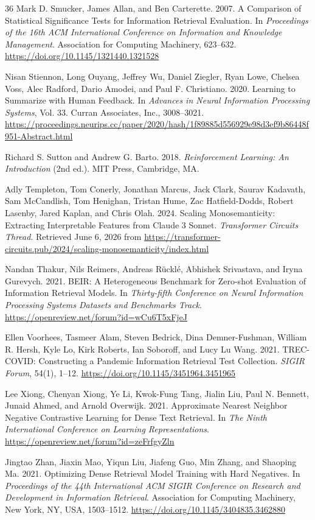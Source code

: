 \documentclass[sigconf]{acmart}
\begin{document}
\begin{thebibliography}{36}
Mark D. Smucker, James Allan, and Ben Carterette. 2007. A Comparison of Statistical Significance Tests for Information Retrieval Evaluation. In \textit{Proceedings of the 16th ACM International Conference on Information and Knowledge Management}. Association for Computing Machinery, 623–632. \url{https://doi.org/10.1145/1321440.1321528}

Nisan Stiennon, Long Ouyang, Jeffrey Wu, Daniel Ziegler, Ryan Lowe, Chelsea Voss, Alec Radford, Dario Amodei, and Paul F. Christiano. 2020. Learning to Summarize with Human Feedback. In \textit{Advances in Neural Information Processing Systems}, Vol. 33. Curran Associates, Inc., 3008–3021. \url{https://proceedings.neurips.cc/paper/2020/hash/1f89885d556929e98d3ef9b86448f951-Abstract.html}

Richard S. Sutton and Andrew G. Barto. 2018. \textit{Reinforcement Learning: An Introduction} (2nd ed.). MIT Press, Cambridge, MA.

Adly Templeton, Tom Conerly, Jonathan Marcus, Jack Clark, Saurav Kadavath, Sam McCandlish, Tom Henighan, Tristan Hume, Zac Hatfield-Dodds, Robert Lasenby, Jared Kaplan, and Chris Olah. 2024. Scaling Monosemanticity: Extracting Interpretable Features from Claude 3 Sonnet. \textit{Transformer Circuits Thread}. Retrieved June 6, 2026 from \url{https://transformer-circuits.pub/2024/scaling-monosemanticity/index.html}

Nandan Thakur, Nils Reimers, Andreas R\"uckl\'e, Abhishek Srivastava, and Iryna Gurevych. 2021. BEIR: A Heterogeneous Benchmark for Zero-shot Evaluation of Information Retrieval Models. In \textit{Thirty-fifth Conference on Neural Information Processing Systems Datasets and Benchmarks Track}. \url{https://openreview.net/forum?id=wCu6T5xFjeJ}

Ellen Voorhees, Tasmeer Alam, Steven Bedrick, Dina Demner-Fushman, William R. Hersh, Kyle Lo, Kirk Roberts, Ian Soboroff, and Lucy Lu Wang. 2021. TREC-COVID: Constructing a Pandemic Information Retrieval Test Collection. \textit{SIGIR Forum}, 54(1), 1–12. \url{https://doi.org/10.1145/3451964.3451965}

Lee Xiong, Chenyan Xiong, Ye Li, Kwok-Fung Tang, Jialin Liu, Paul N. Bennett, Junaid Ahmed, and Arnold Overwijk. 2021. Approximate Nearest Neighbor Negative Contrastive Learning for Dense Text Retrieval. In \textit{The Ninth International Conference on Learning Representations}. \url{https://openreview.net/forum?id=zeFrfgyZln}

Jingtao Zhan, Jiaxin Mao, Yiqun Liu, Jiafeng Guo, Min Zhang, and Shaoping Ma. 2021. Optimizing Dense Retrieval Model Training with Hard Negatives. In \textit{Proceedings of the 44th International ACM SIGIR Conference on Research and Development in Information Retrieval}. Association for Computing Machinery, New York, NY, USA, 1503–1512. \url{https://doi.org/10.1145/3404835.3462880}

\end{thebibliography}
\end{document}
